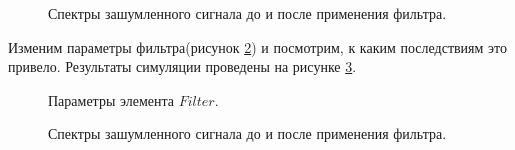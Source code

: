 \documentclass[a4paper,14pt]{extarticle}
\begin{document}
\begin{figure}[H]
\caption{Спектры зашумленного сигнала до и после применения фильтра.}
\label{007}
\end{figure}

Изменим параметры фильтра(рисунок \ref{008}) и посмотрим, к каким последствиям это привело. Результаты симуляции проведены на рисунке \ref{009}.

\begin{figure}[H]
\caption{Параметры элемента $Filter$.}
\label{008}
\end{figure}

\begin{figure}[H]
\caption{Спектры зашумленного сигнала до и после применения фильтра.}
\label{009}
\end{figure}
\end{document}
